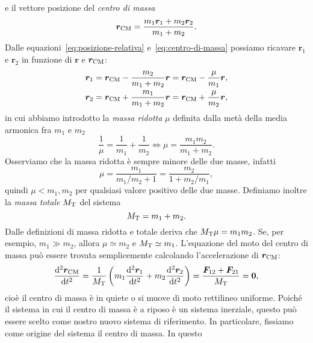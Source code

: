 e il vettore posizione del \emph{centro di massa}
\begin{equation}
  \label{eq:centro-di-massa}
  \bm{r}_\textup{CM} = \frac{m_1\bm{r}_1+m_2\bm{r}_2}{m_1+m_2}.
\end{equation}
Dalle equazioni~\eqref{eq:posizione-relativa} e~\eqref{eq:centro-di-massa}
possiamo ricavare $\bm{r}_1$ e $\bm{r}_2$ in funzione di $\bm{r}$ e
$\bm{r}_\textup{CM}$:
\begin{subequations}
  \label{eq:r1-r2-posizione-relativa-cdm}
  \begin{align}
    \bm{r}_1 &= \bm{r}_\textup{CM} - \frac{m_2}{m_1+m_2}\bm{r} =
    \bm{r}_\textup{CM} - \frac{\mu}{m_1}\bm{r},\\
    \bm{r}_2 &= \bm{r}_\textup{CM} + \frac{m_1}{m_1+m_2}\bm{r} =
    \bm{r}_\textup{CM} + \frac{\mu}{m_2}\bm{r},
  \end{align}
\end{subequations}
in cui abbiamo introdotto la \emph{massa ridotta} $\mu$ definita dalla metà
della media armonica fra $m_1$ e $m_2$
\begin{equation}
  \frac{1}{\mu} = \frac{1}{m_1} + \frac{1}{m_2} \iff \mu=\frac{m_1m_2}{m_1+m_2}.
\end{equation}
Osserviamo che la massa ridotta è sempre minore delle due masse, infatti
\begin{equation}
  \mu =\frac{m_1}{m_1/m_2+1} = \frac{m_2}{1+m_2/m_1},
\end{equation}
quindi $\mu < m_1,m_2$ per qualsiasi valore positivo delle due masse. Definiamo
inoltre la \emph{massa totale} $M_\textup{T}$ del sistema
\begin{equation}
  M_\textup{T}=m_1+m_2.
\end{equation}
Dalle definizioni di massa ridotta e totale deriva che
$M_\textup{T}\mu=m_1m_2$. Se, per esempio, $m_1\gg m_2$, allora $\mu\simeq m_2$ e
$M_\textup{T}\simeq m_1$. L'equazione del moto del centro di massa può essere
trovata semplicemente calcolando l'accelerazione di $\bm{r}_\textup{CM}$:
\begin{equation}
  \toder[2]{\bm{r}_\textup{CM}}{t} = \frac{1}{M_\textup{T}}
  \left(
    m_1\toder[2]{\bm{r}_1}{t} + m_2\toder[2]{\bm{r}_2}{t}
  \right) = \frac{\bm{F}_{12}+\bm{F}_{21}}{M_\textup{T}} = \bm{0},
\end{equation}
cioè il centro di massa è in quiete o si muove di moto rettilineo
uniforme. Poiché il sistema in cui il centro di massa è a riposo è un sistema
inerziale, questo può essere scelto come nostro nuovo sistema di riferimento.
In particolare, fissiamo come origine del sistema il centro di massa. In questo
